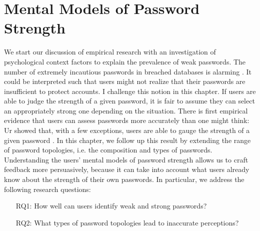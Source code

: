 %

\chapter[Mental Models of Password Strength]{Mental Models of Password Strength}\label{chap:pasdjo}

% 

We start our discussion of empirical research with an investigation of psychological context factors to explain the prevalence of weak passwords. The number of extremely incautious passwords in breached databases is alarming \cite{Weir2009PCFG}. It could be interpreted such that users might not realize that their passwords are insufficient to protect accounts. I challenge this notion in this chapter. If users are able to judge the strength of a given password, it is fair to assume they can select an appropriately strong one depending on the situation. There is first empirical evidence that users can assess passwords more accurately than one might think: Ur \etal showed that, with a few exceptions, users are able to gauge the strength of a given password \cite{Ur2016PerceptionsPassword}. In this chapter, we follow up this result by extending the range of password topologies, i.e. the composition and types of passwords. Understanding the users' mental models of password strength allows us to craft feedback more persuasively, because it can take into account what users already know about the strength of their own passwords. In particular, we address the following research questions: 
\begin{itemize}
	\item[RQ1:] How well can users identify weak and strong passwords?
	\item[RQ2:] What types of password topologies lead to inaccurate perceptions?
\end{itemize}


